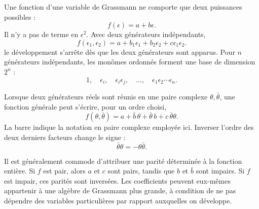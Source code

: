 Une fonction d’une variable de Grassmann ne comporte que deux puissances possibles :
\begin{equation}
f(\epsilon)=a+b\epsilon.
\end{equation}
Il n’y a pas de terme en \(\epsilon^2\). Avec deux générateurs indépendants,
\begin{equation}
f(\epsilon_1,\epsilon_2)
=a+b_1\epsilon_1+b_2\epsilon_2+c\epsilon_1\epsilon_2.
\end{equation}
le développement s’arrête dès que les deux générateurs sont apparus. Pour \(n\) générateurs indépendants, les monômes ordonnés forment une base de dimension \(2^n\) :
\begin{equation}
1,\quad
\epsilon_i,\quad
\epsilon_i\epsilon_j,\quad
\ldots,\quad
\epsilon_1\epsilon_2\cdots\epsilon_n.
\end{equation}

Lorsque deux générateurs réels sont réunis en une paire complexe \(\theta,\bar\theta\), une fonction générale peut s’écrire, pour un ordre choisi,
\begin{equation}
f(\theta,\bar\theta)
=a+\bar b\,\theta+\bar\theta\,b+c\,\bar\theta\theta.
\end{equation}
La barre indique la notation en paire complexe employée ici. Inverser l’ordre des deux derniers facteurs change le signe :
\begin{equation}
\bar\theta\theta=-\theta\bar\theta.
\end{equation}

Il est généralement commode d’attribuer une parité déterminée à la fonction entière. Si \(f\) est pair, alors \(a\) et \(c\) sont pairs, tandis que \(b\) et \(\bar b\) sont impairs. Si \(f\) est impair, ces parités sont inversées. Les coefficients peuvent eux-mêmes appartenir à une algèbre de Grassmann plus grande, à condition de ne pas dépendre des variables particulières par rapport auxquelles on développe.

\begin{classroomqa}
\end{classroomqa}

